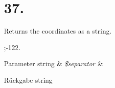 \hypertarget{37_8386013-example}{}\section{37.}
Returns the coordinates as a string.

;-\/122.


\begin{DoxyParams}[1]{Parameter}
string & {\em \$separator} & \\
\hline
\end{DoxyParams}
\begin{DoxyReturn}{Rückgabe}
string
\end{DoxyReturn}

\begin{DoxyCodeInclude}
\end{DoxyCodeInclude}
 